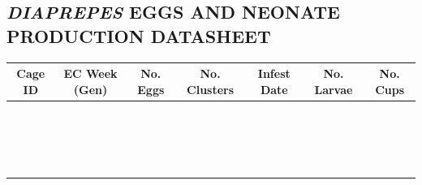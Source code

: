 \documentclass{sop_class}[overrideChapters] %
\begin{document}
{\begin{landscape}
\section{\textit{DIAPREPES} EGGS AND NEONATE PRODUCTION DATASHEET}\label{egg-neo-datasheet}
\begin{table}[!htbp]
    \centering
    \setlength{\tabcolsep}{0.5em}
      \begin{threeparttable}
              \begin{tabular}{|c|c|c|c|c|c|c|}
            \toprule
            {Cage ID} & {EC Week (Gen)} & {No. Eggs} & {No. Clusters} & {Infest Date} & {No. Larvae} & {No. Cups}\\
            \hline
            {} & {} & {} & {} & {} & {} & {}\\
            \hline
            {} & {} & {} & {} & {} & {} & {}\\
            \hline
            {} & {} & {} & {} & {} & {} & {}\\
            \hline
            {} & {} & {} & {} & {} & {} & {}\\
            \hline
            {} & {} & {} & {} & {} & {} & {}\\
            \hline
            {} & {} & {} & {} & {} & {} & {}\\
            \hline
            {} & {} & {} & {} & {} & {} & {}\\
            \hline
            {} & {} & {} & {} & {} & {} & {}\\
            \hline
            {} & {} & {} & {} & {} & {} & {}\\
            \hline
            {} & {} & {} & {} & {} & {} & {}\\
            \hline
            {} & {} & {} & {} & {} & {} & {}\\
            \hline
            {} & {} & {} & {} & {} & {} & {}\\
            \hline
            {} & {} & {} & {} & {} & {} & {}\\
            \hline
            {} & {} & {} & {} & {} & {} & {}\\
            \hline
            {} & {} & {} & {} & {} & {} & {}\\
            \hline
            {} & {} & {} & {} & {} & {} & {}\\
            \hline
            {} & {} & {} & {} & {} & {} & {}\\
            \hline
            {} & {} & {} & {} & {} & {} & {}\\

\end{tabular}
\end{threeparttable}
\end{table}
\end{landscape}}
\end{document}
